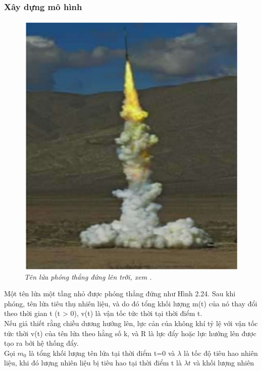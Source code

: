 \subsubsection{Xây dựng mô hình}
\begin{figure}[H]
	\centering
	\includegraphics[scale=0.55]{Images/hinh_2_24.png}
	\caption[Tên lửa phóng thẳng đứng lên trời, xem \cite{ref4}.
	]{\itshape\fontsize{13pt}{0pt}\selectfont\centering Tên lửa phóng thẳng đứng lên trời, xem \cite{ref4}.}
	\label{hinh2.24.}
\end{figure} 
     Một tên lửa một tầng nhỏ được phóng thẳng đứng như Hình 2.24. Sau khi phóng, tên lửa tiêu thụ nhiên liệu, và do đó tổng khối lượng m(t) của nó thay đổi theo thời gian t (t > 0), v(t) là vận tốc tức thời tại thời điểm t.\\
Nếu giả thiết rằng chiều dương hướng lên, lực cản của không khí tỷ lệ với vận tốc tức thời v(t) của tên lửa theo hằng số k, và R là lực đẩy hoặc lực hướng lên được tạo ra bởi hệ thống đẩy.\\
Gọi ${{m}_{0}}$ là tổng khối lượng tên lửa tại thời điểm t=0 và $\lambda $ là tốc độ tiêu hao nhiên 
liệu, khi đó lượng nhiên liệu bị tiêu hao tại thời điểm t là $\lambda t$ và khối lượng nhiên 
